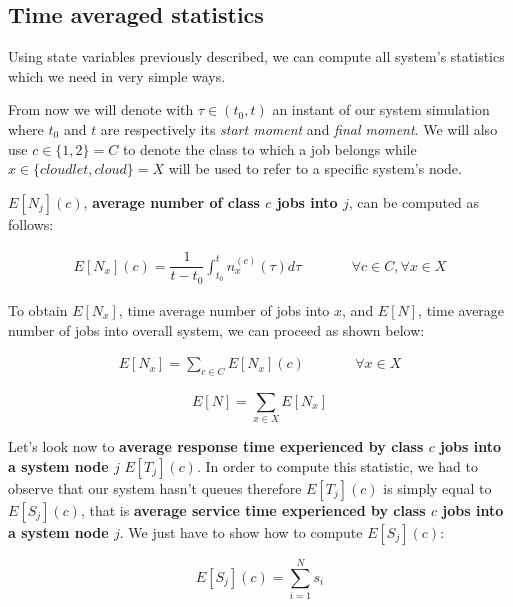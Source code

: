 \documentclass[10pt,a4paper]{article}
\begin{document}
\subsection{Time averaged statistics}

Using state variables previously described, we can compute all system's statistics which we need in very simple ways.

From now we will denote with $\tau \in (t_0, t)$ an instant of our system simulation where $t_0$ and $t$ are respectively its \textit{start moment} and \textit{final moment}. We will also use $c \in \lbrace 1,2 \rbrace = C$  to denote the class to which a job belongs while $x \in \lbrace cloudlet,cloud \rbrace = X$ will be used to refer to a specific system's node.

$E[N_j](c)$, \textbf{average number of class $c$ jobs into $j$}, can be computed as follows: 

\begin{equation}
\begin{array} {lcr} 
\displaystyle E[N_x](c) = \dfrac{1}{t-t_0}\int_{t_0}^t n_x^{(c)}(\tau)d\tau & \qquad & \forall c \in C, \forall x \in X
\end{array}
\end{equation}

To obtain $E[N_x]$, time average number of jobs into $x$, and $E[N]$, time average number of jobs into overall system, we can proceed as shown below:

\begin{equation}
\begin{array} {lcr} 
E[N_x] = \sum_{c \in C} E[N_x](c) & \qquad & \forall x \in X
\end{array}
\end{equation}

\begin{equation}
E[N] = \sum_{x \in X} E[N_x]
\end{equation}


Let's look now to \textbf{average response time experienced by class $c$ jobs into a system node $j$} $E[T_j](c)$.
In order to compute this statistic, we had to observe that our system hasn't queues therefore $E[T_j](c)$ is simply equal to $E[S_j](c)$, that is \textbf{average service time experienced by class $c$ jobs into a system node $j$}. We just have to show how to compute $E[S_j](c)$:

\begin{equation}
E[S_j](c) = \sum_{i=1}^N s_{i}
\end{equation}
\end{document}
